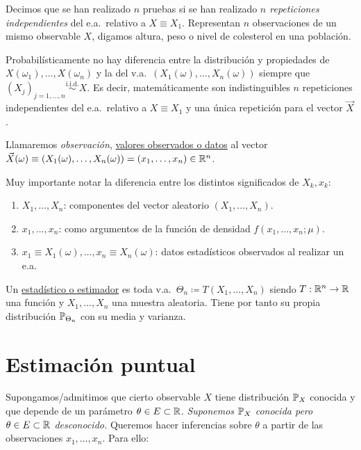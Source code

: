 \begin{definicion}[2]
Decimos que se han realizado $n$ pruebas si se han realizado \emph{$n$ repeticiones independientes} del e.a.\ relativo a $X \equiv X_1$. Representan $n$ observaciones de un mismo observable $X$, digamos altura, peso o nivel de colesterol en una población.
\end{definicion}

\begin{observacion}[2]
Probabilísticamente no hay diferencia entre la distribución y propiedades de $X(\omega_1), \dots, X(\omega_n)$ y la del v.a.\ $(X_1(\omega), \dots, X_n(\omega))$ siempre que $(X_j)_{j=1,\dots,n} \stackrel{\text{i.i.d.}}{\sim} X$. Es decir, matemáticamente son indistinguibles $n$ repeticiones independientes del e.a.\ relativo a $X \equiv X_1$ y una única repetición para el vector $\vec{X}$.

Llamaremos \emph{observación}, \underline{valores observados o datos} al vector $\vec{X}(\omega) \equiv (X_1(\omega), \dots, X_n(\omega)) = (x_1, \dots, x_n) \in \mathbb{R}^n$.
\end{observacion}

\begin{observacion}[3]
Muy importante notar la diferencia entre los distintos significados de $X_k, x_k$:
\begin{enumerate}
  \item $X_1, \dots, X_n$: componentes del vector aleatorio $(X_1, \dots, X_n)$.
  \item $x_1, \dots, x_n$: como argumentos de la función de densidad $f(x_1, \dots, x_n; \mu)$.
  \item $x_1 \equiv X_1(\omega), \dots, x_n \equiv X_n(\omega)$: datos estadísticos observados al realizar un e.a.
\end{enumerate}
\end{observacion}

\begin{definicion}[3]
Un \underline{estadístico o estimador} es toda v.a.\ $\Theta_n \coloneqq T(X_1, \dots, X_n)$ siendo $T : \mathbb{R}^n \to \mathbb{R}$ una función y $X_1, \dots, X_n$ una muestra aleatoria. Tiene por tanto su propia distribución $\mathbb{P}_{\Theta_n}$ con su media y varianza.
\end{definicion}

\section{Estimación puntual}

Supongamos/admitimos que cierto observable $X$ tiene distribución $\mathbb{P}_X$ conocida y que depende de un parámetro $\theta \in E \subset \mathbb{R}$. \emph{Suponemos $\mathbb{P}_X$ conocida pero $\theta \in E \subset \mathbb{R}$ desconocido.} Queremos hacer inferencias sobre $\theta$ a partir de las observaciones $x_1, \dots, x_n$. Para ello:

